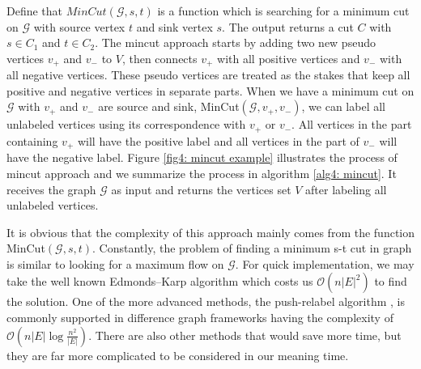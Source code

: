 Define that $MinCut(\mathcal{G}, s, t)$ is a function which is searching for a minimum cut on $\mathcal{G}$ with source vertex $t$ and sink vertex $s$. The output returns a cut $C$ with $s \in C_1$ and $t \in C_2$. The mincut approach starts by adding two new pseudo vertices $v_+$ and $v_-$ to $V$, then connects $v_+$ with all positive vertices and $v_-$ with all negative vertices. These pseudo vertices are treated as the stakes that keep all positive and negative vertices in separate parts. When we have a minimum cut on $\mathcal{G}$ with $v_+$ and $v_-$ are source and sink, MinCut$(\mathcal{G}, v_+, v_-)$, we can label all unlabeled vertices using its correspondence with $v_+$ or $v_-$. All vertices in the part containing $v_+$ will have the positive label and all vertices in the part of $v_-$ will have the negative label. Figure \ref{fig4: mincut example} illustrates the process of mincut approach and we summarize the process in algorithm \ref{alg4: mincut}. It receives the graph $\mathcal{G}$ as input and returns the vertices set $V$ after labeling all unlabeled vertices.

It is obvious that the complexity of this approach mainly comes from the function MinCut$(\mathcal{G}, s, t)$. Constantly, the problem of finding a minimum s-t cut in graph is similar to looking for a maximum flow on $\mathcal{G}$. For quick implementation, we may take the well known Edmonds–Karp algorithm \parencite{Edmonds:1972:TIA:321694.321699} which costs us $\mathcal{O}(n|E|^2)$ to find the solution. One of the more advanced methods, the push-relabel algorithm \parencite{KING1994447}, is commonly supported in difference graph frameworks having the complexity of $\mathcal{O}(n|E|\log{\frac{n^2}{|E|}})$. There are also other methods that would save more time, but they are far more complicated to be considered in our meaning time.

